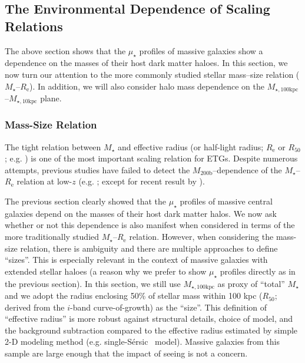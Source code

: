 \documentclass[a4paper,fleqn,usenatbib]{mnras}
\def\ser{{S\'{e}rsic\ }}
\def\mstar{{$M_{\star}$}}
\def\mhalo{{$M_{\mathrm{200b}}$}}
\def\minn{{$M_{\star,10\mathrm{kpc}}$}}
\def\mtot{{$M_{\star,100\mathrm{kpc}}$}}
\def\mden{{$\mu_{\star}$}}
\begin{document}

\subsection{The Environmental Dependence of Scaling Relations}
    \label{ssec:scaling}
    
    The above section shows that the \mden{} profiles of massive galaxies show a 
    dependence on the masses of their host dark matter haloes. 
    In this section, we now turn our attention to the more commonly studied stellar 
    mass--size relation (\mstar{}--$R_{\mathrm{e}}$). 
    In addition, we will also consider halo mass dependence on the 
    \mtot{}--\minn{} plane. 
    
\subsubsection{Mass-Size Relation}
    \label{sssec:mass_size}
    
    The tight relation between \mstar{} and effective radius (or half-light radius; 
    $R_{\mathrm{e}}$ or $R_{\mathrm{50}}$; e.g. \citealt{Shankar2013, Leja2013, 
    vdWel2014}) is one of the most important scaling relation for ETGs. 
    Despite numerous attempts, previous studies have failed to detect the 
    \mhalo{}--dependence of the \mstar{}--$R_{\mathrm{e}}$ relation at low-$z$ 
    (e.g. \citealt{Weinmann2009, Nair2010, HCompany13, Cerbrian2014}; 
    except for recent result by \citealt{Yoon2017}). 
    
    The previous section clearly showed that the \mden{} profiles of massive central 
    galaxies depend on the masses of their host dark matter halos. 
    We now ask whether or not this dependence is also manifest when considered in 
    terms of the more traditionally studied \mstar{}--$R_{\mathrm{e}}$ relation. 
    However, when considering the mass-size relation, there is ambiguity and there are
    multiple approaches to define ``sizes''. 
    This is especially relevant in the context of massive galaxies with extended 
    stellar haloes (a reason why we prefer to show \mden{} profiles directly as in 
    the previous section). 
    In this section, we still use \mtot{} as proxy of ``total'' \mstar{} and we adopt 
    the radius enclosing 50\% of stellar mass within 100 kpc ($R_{\mathrm{50}}$; 
    derived from the $i$-band curve-of-growth) as the ``size''. 
    This definition of ``effective radius'' is more robust against structural details, 
    choice of model, and the background subtraction compared to the effective radius 
    estimated by simple 2-D modeling method (e.g. single-\ser{} model). 
    Massive galaxies from this sample are large enough that the impact of seeing is 
    not a concern.
    
\end{document}
